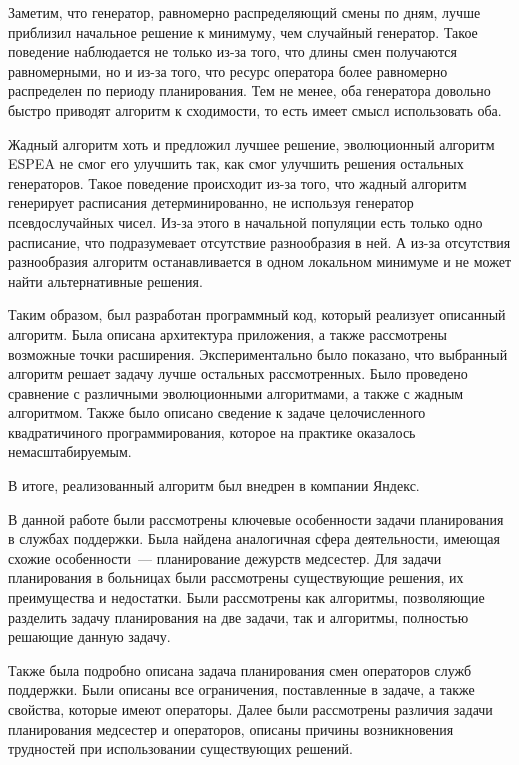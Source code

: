 \documentclass[times,specification,annotation]{itmo-student-thesis}
\begin{document}
Заметим, что генератор, равномерно распределяющий смены по дням, лучше приблизил начальное решение к минимуму, чем случайный генератор.
Такое поведение наблюдается не только из-за того, что длины смен получаются равномерными, но и из-за того, что ресурс оператора более равномерно распределен по периоду планирования.
Тем не менее, оба генератора довольно быстро приводят алгоритм к сходимости, то есть имеет смысл использовать оба.

Жадный алгоритм хоть и предложил лучшее решение, эволюционный алгоритм ESPEA не смог его улучшить так, как смог улучшить решения остальных генераторов.
Такое поведение происходит из-за того, что жадный алгоритм генерирует расписания детерминированно, не используя генератор псевдослучайных чисел.
Из-за этого в начальной популяции есть только одно расписание, что подразумевает отсутствие разнообразия в ней.
А из-за отсутствия разнообразия алгоритм останавливается в одном локальном минимуме и не может найти альтернативные решения.

\chapterconclusion

Таким образом, был разработан программный код, который реализует описанный алгоритм.
Была описана архитектура приложения, а также рассмотрены возможные точки расширения.
Экспериментально было показано, что выбранный алгоритм решает задачу лучше остальных рассмотренных.
Было проведено сравнение с различными эволюционными алгоритмами, а также с жадным алгоритмом.
Также было описано сведение к задаче целочисленного квадратичиного программирования, которое на практике оказалось немасштабируемым.

В итоге, реализованный алгоритм был внедрен в компании Яндекс.

\startconclusionpage

В данной работе были рассмотрены ключевые особенности задачи планирования в службах поддержки.
Была найдена аналогичная сфера деятельности, имеющая схожие особенности~--- планирование дежурств медсестер.
Для задачи планирования в больницах были рассмотрены существующие решения, их преимущества и недостатки.
Были рассмотрены как алгоритмы, позволяющие разделить задачу планирования на две задачи, так и алгоритмы, полностью решающие данную задачу.

Также была подробно описана задача планирования смен операторов служб поддержки.
Были описаны все ограничения, поставленные в задаче, а также свойства, которые имеют операторы.
Далее были рассмотрены различия задачи планирования медсестер и операторов, описаны причины возникновения трудностей при использовании существующих решений.
\end{document}
